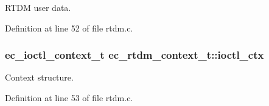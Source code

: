 \-R\-T\-D\-M user data. 



\-Definition at line 52 of file rtdm.\-c.

\subsubsection[{ioctl\-\_\-ctx}]{\setlength{\rightskip}{0pt plus 5cm}ec\-\_\-ioctl\-\_\-context\-\_\-t {\bf ec\-\_\-rtdm\-\_\-context\-\_\-t\-::ioctl\-\_\-ctx}}\label{structec__rtdm__context__t_ad605852d8673c7094398ea5307d3737b}


\-Context structure. 



\-Definition at line 53 of file rtdm.\-c.

